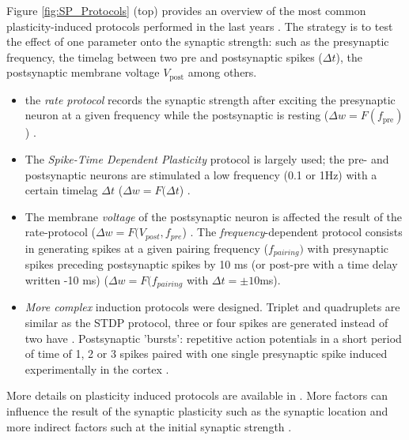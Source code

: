 Figure \ref{fig:SP_Protocols} (top) provides an overview of the most common plasticity-induced protocols performed in the last years \citep{krieg_unifying_2014}. The strategy is to test the effect of one parameter onto the synaptic strength: such as the presynaptic frequency, the timelag between two pre and postsynaptic spikes ($\Delta t$), the postsynaptic membrane voltage $V_{\mathrm{post}}$ among others.
\begin{itemize}
    \item  the \textit{rate protocol} records the synaptic strength after exciting the presynaptic neuron at a given frequency while the postsynaptic is resting ($ \Delta w =F(f_{\mathrm{pre}}) $) \citep{dudek_homosynaptic_1992, frey_synaptic_1998, gerstner_hebbian_2011}.
    \item The \textit{Spike-Time Dependent Plasticity} protocol is largely used; the pre- and postsynaptic neurons are stimulated a low frequency (0.1 or 1Hz) with a certain timelag $\Delta t$ ($\Delta w =F(\Delta t$) \citep{debanne_asynchronous_1994, bi_synaptic_1998, markram_regulation_1997, abbott_synaptic_2000, gerstner_neuronal_1996}.
    \item The membrane \textit{voltage} of the postsynaptic neuron is affected the result of the rate-protocol ($\Delta w =F(V_{post}, f_{pre}$) \citep{bi_synaptic_1998, artola_different_1990, sjostrom_rate_2001, ngezahayo_synaptic_2000, artola_long-term_1993}.
     The \textit{frequency}-dependent protocol consists in generating spikes at a given pairing frequency ($f_{pairing})$  with presynaptic spikes preceding postsynaptic spikes by 10 ms (or post-pre with a time delay written -10 ms) ($\Delta w =F(f_{pairing}$ with $\Delta t = \pm 10 $ms)\citep{sjostrom_rate_2001}.
     \item \textit{More complex} induction protocols were designed. Triplet and quadruplets are similar as the STDP protocol, three or four spikes are generated instead of two have \citep{wang_coactivation_2005, froemke_spike-timing-dependent_2002, froemke_contribution_2006, wittenberg_malleability_2006}. Postsynaptic 'bursts':  repetitive action potentials in a short period of time of 1, 2 or 3 spikes paired with one single presynaptic spike induced experimentally in the cortex \citep{nevian_spine_2006, debanne_asynchronous_1994,froemke_contribution_2006}.
\end{itemize}
More details on plasticity induced protocols are available in \citep{inglebert_synaptic_2021, krieg_unifying_2014}. More factors can influence the result of the synaptic plasticity such as the synaptic location \citep{froemke_spike-timing-dependent_2002, sjostrom_cooperative_2006} and more indirect factors such at the initial synaptic strength \citep{ngezahayo_synaptic_2000}. 

